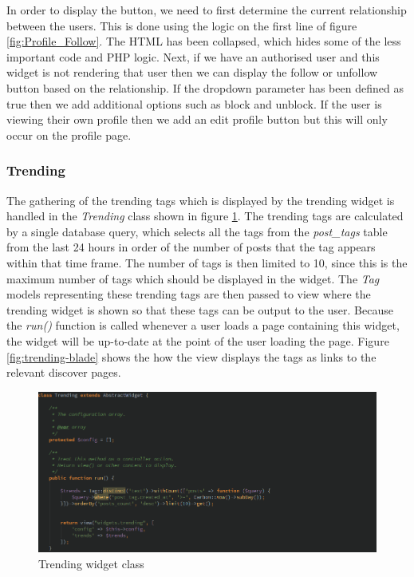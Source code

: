 In order to display the button, we need to first determine the current relationship between the users. This is done using the logic on the first line of figure \ref{fig:Profile_Follow}. The HTML has been collapsed, which hides some of the less important code and PHP logic. Next, if we have an authorised user and this widget is not rendering that user then we can display the follow or unfollow button based on the relationship. If the dropdown parameter has been defined as true then we add additional options such as block and unblock. If the user is viewing their own profile then we add an edit profile button but this will only occur on the profile page.

\subsubsection{Trending}
The gathering of the trending tags which is displayed by the trending widget is handled in the \emph{Trending} class shown in figure \ref{fig:trending-class}. The trending tags are calculated by a single database query, which selects all the tags from the \emph{post\_tags} table from the last 24 hours in order of the number of posts that the tag appears within that time frame. The number of tags is then limited to 10, since this is the maximum number of tags which should be displayed in the widget. The \emph{Tag} models representing these trending tags are then passed to view where the trending widget is shown so that these tags can be output to the user. Because the \textit{run()} function is called whenever a user loads a page containing this widget, the widget will be up-to-date at the point of the user loading the page. Figure \ref{fig:trending-blade} shows the how the view displays the tags as links to the relevant discover pages.

\begin{figure}[H]
	\centering
	\includegraphics[width=\textwidth]{Images/Implementation/UI/Widgets/trending-class}
	\caption{Trending widget class}
	\label{fig:trending-class}
\end{figure}

